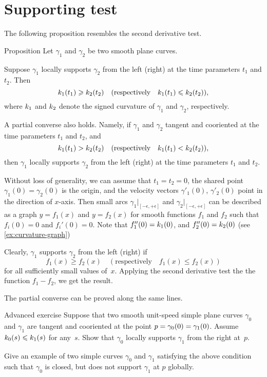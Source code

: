 \section{Supporting test}

The following proposition resembles the second derivative test. 

\begin{thm}{Proposition}\label{prop:supporting-circline}
Let $\gamma_1$ and $\gamma_2$ be two smooth plane curves.

Suppose $\gamma_1$ locally supports $\gamma_2$ from the left (right) at the time parameters $t_1$ and $t_2$.
Then 
\[k_1(t_1)\geqslant k_2(t_2)\quad(\text{respectively}\quad k_1(t_1)\leqslant k_2(t_2)),\]
where $k_1$ and $k_2$ denote the signed curvature of $\gamma_1$ and $\gamma_2$, respectively.

A partial converse also holds.
Namely, if $\gamma_1$ and $\gamma_2$ tangent and cooriented at the time parameters $t_1$ and $t_2$,
and 
\[k_1(t_1)> k_2(t_2)\quad(\text{respectively}\quad k_1(t_1)< k_2(t_2)),\]
then $\gamma_1$ locally supports $\gamma_2$ from the left (right) at the time parameters $t_1$ and $t_2$. 
\end{thm}

 Without loss of generality, we can assume that $t_1=t_2=0$, the shared point $\gamma_1(0)=\gamma_2(0)$ is the origin, and the velocity vectors $\gamma'_1(0)$, $\gamma'_2(0)$ point in the direction of $x$-axis.
Then small arcs $\gamma_1|_{[-\epsilon,+\epsilon]}$ and $\gamma_2|_{[-\epsilon,+\epsilon]}$ can be described as a graph 
$y=f_1(x)$ and $y=f_2(x)$ for smooth functions $f_1$ and $f_2$ such that $f_i(0)=0$ and $f_i'(0)=0$.
Note that $f_1''(0)=k_1(0)$, and $f_2''(0)=k_2(0)$ (see \ref{ex:curvature-graph})

Clearly, $\gamma_1$ supports $\gamma_2$ from the left (right) if 
\[f_1(x)\ge f_2(x)\quad(\text{respectively}\quad f_1(x)\le f_2(x))\]
for all sufficiently small values of~$x$.
Applying the second derivative test the the function $f_1-f_2$, we get the result.

The partial converse can be proved along the same lines.
\qeds


\begin{thm}{Advanced exercise}\label{ex:support}
Suppose that two smooth unit-speed simple plane curves $\gamma_0$ and $\gamma_1$ are tangent and cooriented at the point $p\z=\gamma_0(0)\z=\gamma_1(0)$.
Assume $k_0(s)\leqslant k_1(s)$ for any~$s$.
Show that $\gamma_0$ locally supports $\gamma_1$ from the right at~$p$.

Give an example of two simple curves $\gamma_0$ and $\gamma_1$ satisfying the above condition such that $\gamma_0$ is closed, but does not support $\gamma_1$ at $p$ globally.
\end{thm}


